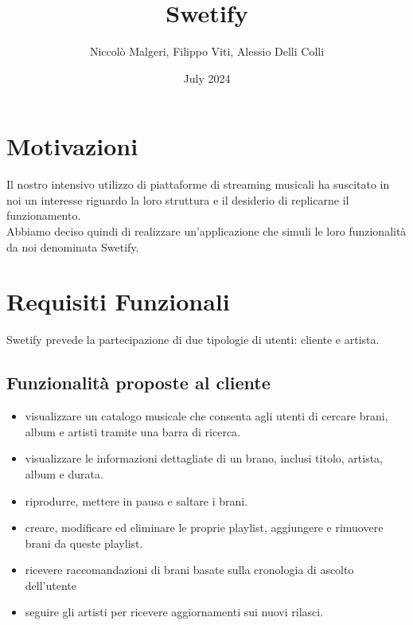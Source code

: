 \documentclass{article}
\title{Swetify}
\author{Niccolò Malgeri, Filippo Viti, Alessio Delli Colli}
\date{July 2024}
\begin{document}
  \maketitle

  \tableofcontents
  \newpage


  \section{Motivazioni}
  Il nostro intensivo utilizzo di piattaforme di streaming musicali ha suscitato in noi un interesse riguardo
  la loro struttura e il desiderio di replicarne il funzionamento.\\
  Abbiamo deciso quindi di realizzare un'applicazione che simuli le loro funzionalità da noi denominata Swetify.
  \section{Requisiti Funzionali}
  Swetify prevede la partecipazione di due tipologie di utenti: cliente e artista.

  \subsection{Funzionalità proposte al cliente}

  \begin{itemize}
    \item
    visualizzare un catalogo musicale che consenta agli utenti di cercare brani, album e artisti tramite una barra
    di ricerca.

    \item
    visualizzare le informazioni dettagliate di un brano, inclusi titolo, artista, album e durata.

    \item
    riprodurre, mettere in pausa e saltare i brani.

    \item
    creare, modificare ed eliminare le proprie playlist, aggiungere e rimuovere brani da queste playlist.

    \item
    ricevere raccomandazioni di brani basate sulla cronologia di ascolto dell'utente

    \item
    seguire gli artisti per ricevere aggiornamenti sui nuovi rilasci.

  \end{itemize}
\end{document}
